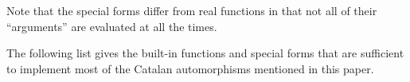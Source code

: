 \documentclass[11pt]{article} %
\newcommand{\scmsym}[1]{{\tt{#1}}}
\newtheorem{note}[theorem]{Note}
\begin{document}
Note that the special forms differ from real functions in that
not all of their ``arguments'' are evaluated at all the times.




The following list gives the built-in functions and special forms
that are sufficient to implement most of the Catalan automorphisms mentioned
in this paper.
\end{document}
